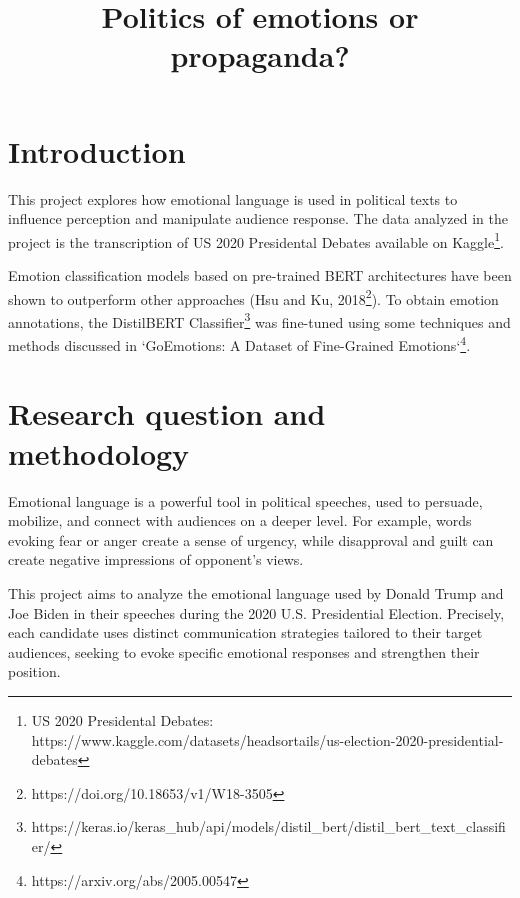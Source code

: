 \documentclass[pdflatex,sn-mathphys-num]{sn-jnl}%
\begin{document}
\title[Article Title]{Politics of emotions or propaganda?}

\author{ }



\maketitle

\section{Introduction}\label{sec1}

This project explores how emotional language is used in political texts to influence perception and manipulate audience response. The data analyzed in the project is the transcription of US 2020 Presidental Debates available on Kaggle\footnote{US 2020 Presidental Debates: \\ https://www.kaggle.com/datasets/headsortails/us-election-2020-presidential-debates}. 

Emotion classification models based on pre-trained BERT architectures have been shown to outperform other approaches (Hsu and Ku, 2018\footnote{https://doi.org/10.18653/v1/W18-3505}). To obtain emotion annotations, the DistilBERT Classifier\footnote{https://keras.io/keras_hub/api/models/distil_bert/distil_bert_text_classifier/} was fine-tuned using some techniques and methods discussed in `GoEmotions: A Dataset of Fine-Grained Emotions`\footnote{https://arxiv.org/abs/2005.00547}. 


\section{Research question and methodology}\label{sec2}

Emotional language is a powerful tool in political speeches, used to persuade, mobilize, and connect with audiences on a deeper level. For example, words evoking fear or anger create a sense of urgency, while disapproval and guilt can create negative impressions of opponent's views.

This project aims to analyze the emotional language used by Donald Trump and Joe Biden in their speeches during the 2020 U.S. Presidential Election. Precisely, each candidate uses distinct communication strategies tailored to their target audiences, seeking to evoke specific emotional responses and strengthen their position.
\end{document}
